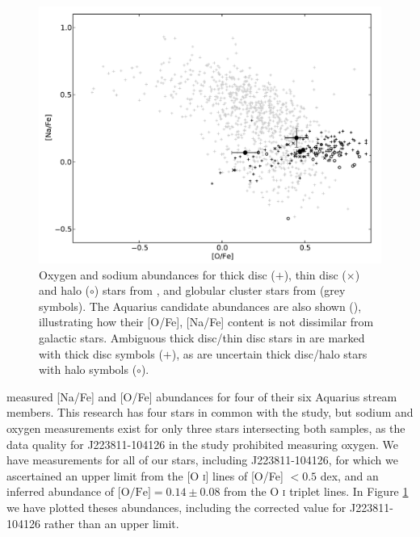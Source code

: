 \documentclass{emulateapj}
\begin{document}
\begin{figure}[t!]
	\includegraphics[width=\textwidth]{./figures/aquarius-o-na-halo.pdf}
	\caption{Oxygen and sodium abundances for thick disc ($+$), thin disc ($\times$) and halo ($\circ$) stars from \citet{reddy;et-al_2005}, and globular cluster stars from \citet{carretta;et-al_2009} (grey symbols). The Aquarius candidate abundances are also shown (\textbullet), illustrating how their [O/Fe], [Na/Fe] content is not dissimilar from galactic stars. Ambiguous thick disc/thin disc stars in \citet{reddy;et-al_2005} are marked with thick disc symbols ($+$), as are uncertain thick disc/halo stars with halo symbols ($\circ$).}
	\label{fig:o-na}
\end{figure}

\citet{wylie-de-boer;et-al_2012} measured [Na/Fe] and [O/Fe] abundances for four of their six Aquarius stream members. This research has four stars in common with the \citet{wylie-de-boer;et-al_2012} study, but sodium and oxygen measurements exist for only three stars intersecting both samples, as the data quality for J223811-104126 in the \citet{wylie-de-boer;et-al_2012} study prohibited measuring oxygen. We have measurements for all of our stars, including J223811-104126, for which we ascertained an upper limit from the [O \textsc{i}] lines of [O/Fe] $< 0.5$ dex, and an inferred abundance of $\mbox{[O/Fe]} = 0.14 \pm 0.08$ from the O \textsc{i} triplet lines. In Figure \ref{fig:o-na} we have plotted theses abundances, including the corrected value for J223811-104126 rather than an upper limit.


\end{document}
